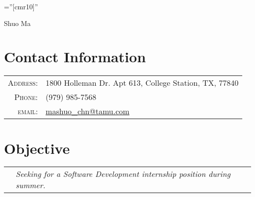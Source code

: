 \documentclass[a4paper,10pt]{article}
\begin{document}
\pagestyle{empty} %
\font\fb=''[cmr10]'' %

{\centering
	{\Huge Shuo Ma}
}

\section{Contact Information}

\begin{tabular}{rl}
    \textsc{Address:}   & 1800 Holleman Dr. Apt 613, College Station, TX, 77840 \\
    \textsc{Phone:}     & (979) 985-7568\\
    \textsc{email:}     & \href{mailto:mashuo\_chn@tamu.com}{mashuo\_chn@tamu.com}
\end{tabular}





\section{Objective}
\begin{tabular}{rl}
    &\textit{Seeking for a Software Development internship position during summer.}
\end{tabular}



\end{document}

